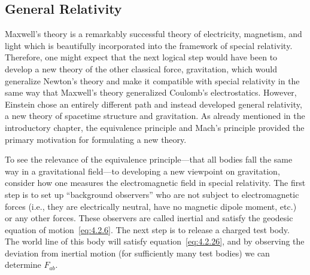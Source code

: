 
\subsection{General Relativity}\label{sec:4.3}

Maxwell's theory is a remarkably successful theory of electricity, magnetism, and
light which is beautifully incorporated into the framework of special relativity.
Therefore, one might expect that the next logical step would have been to develop
a new theory of the other classical force, gravitation, which would generalize
Newton's theory and make it compatible with special relativity in the same way that
Maxwell's theory generalized Coulomb's electrostatics. However, Einstein chose an
entirely different path and instead developed general relativity, a new theory of
spacetime structure and gravitation. As already mentioned in the introductory
chapter, the equivalence principle and Mach's principle provided the primary
motivation for formulating a new theory.

To see the relevance of the equivalence principle---that all bodies fall the same
way in a gravitational field---to developing a new viewpoint on gravitation,
consider how one measures the electromagnetic field in special relativity. The
first step is to set up \textquotedblleft background
observers\textquotedblright{} who are not subject to electromagnetic forces (i.e.,
they are electrically neutral, have no magnetic dipole moment, etc.) or any other
forces. These observers are called inertial and satisfy the geodesic equation of
motion~\eqref{eq:4.2.6}. The next step is to release a charged test body. The
world line of this body will satisfy equation~\eqref{eq:4.2.26}, and by observing
the deviation from inertial motion (for sufficiently many test bodies) we can
determine \(F_{ab}\).

